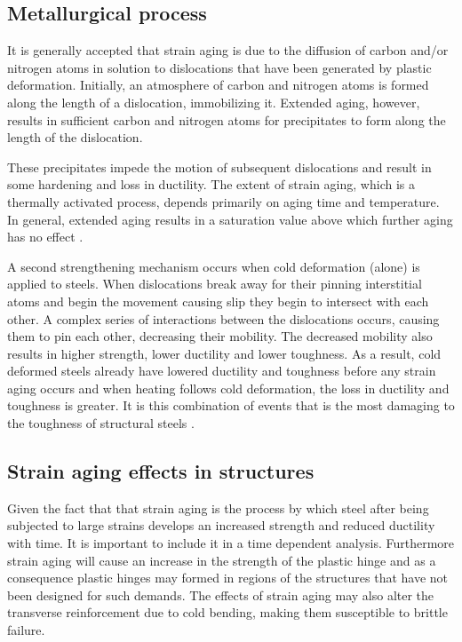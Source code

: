 \subsection{Metallurgical process}

It is generally accepted that strain aging is due to the diffusion of carbon and/or nitrogen atoms in solution to dislocations that have been generated by plastic deformation. Initially, an atmosphere of carbon and nitrogen atoms is formed along the length of a dislocation, immobilizing it. Extended aging, however, results in sufficient carbon and nitrogen atoms for precipitates to form along the length of the dislocation\cite{Overby2017}\cite{Hosseini2015}.

These precipitates impede the motion of subsequent dislocations and result in some hardening and loss in ductility. The extent of strain aging, which is a thermally activated process, depends primarily on aging time and temperature. In general, extended aging results in a saturation value above which further aging has no effect \cite{Restrepo-Posada1994}.

A second strengthening mechanism occurs when cold deformation (alone) is applied to steels. When dislocations break away for their pinning interstitial atoms and begin the movement causing slip they begin to intersect with each other. A complex series of interactions between the dislocations occurs, causing them to pin each other, decreasing their mobility. The decreased mobility also results in higher strength, lower ductility and lower toughness. As a result, cold deformed steels already have lowered ductility and toughness before any strain aging occurs and when heating follows cold deformation, the loss in ductility and toughness is greater. It is this combination of events that is the most damaging to the toughness of structural steels \cite{Momtahan2009}.

\subsection{Strain aging effects in structures}

Given the fact that that strain aging is the process by which steel after being subjected to large strains develops an increased strength and reduced ductility with time. It is  important to include it in a time dependent analysis. Furthermore strain aging will cause an increase in the strength of the plastic hinge and as a consequence plastic hinges may formed in regions of the structures that have not been designed for such demands. The effects of strain aging may also alter the transverse reinforcement due to cold bending, making them susceptible to brittle failure\cite{Momtahan2009}.

